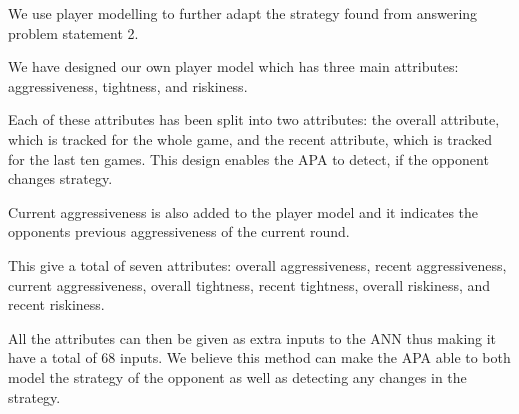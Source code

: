 We use player modelling to further adapt the strategy found from answering problem statement 2. 

We have designed our own player model which has three main attributes: aggressiveness, tightness, and riskiness.

Each of these attributes has been split into two attributes: the overall attribute, which is tracked for the whole game, and the recent attribute, which is tracked for the last ten games. This design enables the APA to detect, if the opponent changes strategy. 

Current aggressiveness is also added to the player model and it indicates the opponents previous aggressiveness of the current round.

This give a total of seven attributes: overall aggressiveness, recent aggressiveness, current aggressiveness, overall tightness, recent tightness, overall riskiness, and recent riskiness.

All the attributes can then be given as extra inputs to the ANN thus making it have a total of 68 inputs. We believe this method can make the APA able to both model the strategy of the opponent as well as detecting any changes in the strategy. 